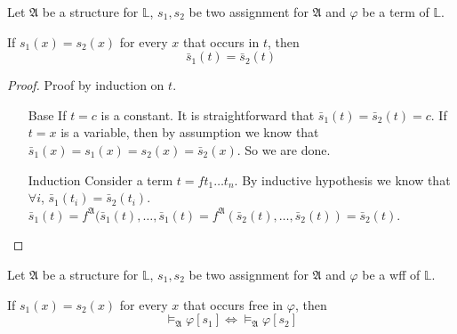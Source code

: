 \begin{lemma}
    \label{lem:LemmaForFreeOccurrenceThm}
    Let $\mathfrak{A}$ be a structure for $\mathbb{L}$, $s_1, s_2$ be two assignment for $\mathfrak{A}$ and $\varphi$ be a term of $\mathbb{L}$.

    If $s_1(x)=s_2(x)$ for every $x$ that occurs in $t$, then
    \[ \bar{s}_1(t) = \bar{s}_2(t) \]
\end{lemma}
\begin{proof}
    Proof by induction on $t$.
    \begin{itemize}
        \item[Base] If $t=c$ is a constant. It is straightforward that $\bar{s}_1(t) = \bar{s}_2(t) = c$. If $t=x$ is a variable, then by assumption we know that $\bar{s}_1(x) = s_1(x) = s_2(x) = \bar{s}_2(x)$. So we are done.
        \item[Induction] Consider a term $t=ft_1\dots t_n$. By inductive hypothesis we know that $\forall i$, $\bar{s}_1(t_i) = \bar{s}_2(t_i)$. $\bar{s}_1(t) = f^{\mathfrak{A}}(\bar{s}_1(t), \dots, \bar{s}_1(t) = f^{\mathfrak{A}}(\bar{s}_2(t), \dots, \bar{s}_2(t)) = \bar{s}_2(t)$.
    \end{itemize}
\end{proof}

\begin{theorem}
    Let $\mathfrak{A}$ be a structure for $\mathbb{L}$, $s_1, s_2$ be two assignment for $\mathfrak{A}$ and $\varphi$ be a wff of $\mathbb{L}$.

    If $s_1(x)=s_2(x)$ for every $x$ that occurs free in $\varphi$, then
    \[ \vDash_{\mathfrak{A}}\varphi[s_1] \Leftrightarrow \vDash_{\mathfrak{A}}\varphi[s_2] \]
\end{theorem}

